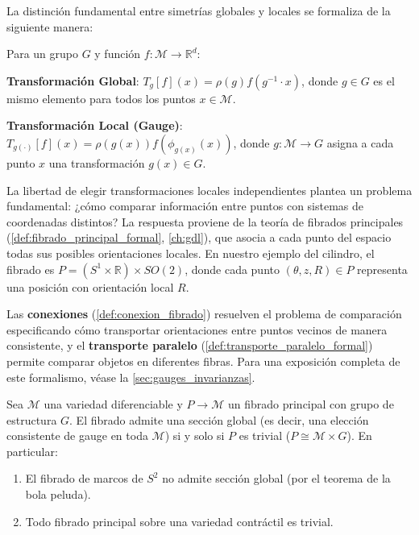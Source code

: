 La distinción fundamental entre simetrías globales y locales se formaliza de la siguiente manera:

\begin{definition}
Para un grupo $G$ y función $f: \mathcal{M} \to \mathbb{R}^d$:

\textbf{Transformación Global}: $T_g[f](x) = \rho(g) f(g^{-1} \cdot x)$, donde $g \in G$ es el mismo elemento para todos los puntos $x \in \mathcal{M}$.

\textbf{Transformación Local (Gauge)}: $T_{g(\cdot)}[f](x) = \rho(g(x)) f(\phi_{g(x)}(x))$, donde $g: \mathcal{M} \to G$ asigna a cada punto $x$ una transformación $g(x) \in G$.
\end{definition}

La libertad de elegir transformaciones locales independientes plantea un problema fundamental: ¿cómo comparar información entre puntos con sistemas de coordenadas distintos? La respuesta proviene de la teoría de fibrados principales (\autoref{def:fibrado_principal_formal}, \autoref{ch:gdl}), que asocia a cada punto del espacio todas sus posibles orientaciones locales. En nuestro ejemplo del cilindro, el fibrado es $P = (S^1 \times \mathbb{R}) \times SO(2)$, donde cada punto $(\theta, z, R) \in P$ representa una posición con orientación local $R$.

Las \textbf{conexiones} (\autoref{def:conexion_fibrado}) resuelven el problema de comparación especificando cómo transportar orientaciones entre puntos vecinos de manera consistente, y el \textbf{transporte paralelo} (\autoref{def:transporte_paralelo_formal}) permite comparar objetos en diferentes fibras. Para una exposición completa de este formalismo, véase la \autoref{sec:gauges_invarianzas}.

\begin{proposition}\label{prop:obstruccion_gauge_global}
Sea $\mathcal{M}$ una variedad diferenciable y $P \to \mathcal{M}$ un fibrado principal con grupo de estructura $G$. El fibrado admite una sección global (es decir, una elección consistente de gauge en toda $\mathcal{M}$) si y solo si $P$ es trivial ($P \cong \mathcal{M} \times G$). En particular:
\begin{enumerate}
    \item El fibrado de marcos de $S^2$ no admite sección global (por el teorema de la bola peluda).
    \item Todo fibrado principal sobre una variedad contráctil es trivial.
\end{enumerate}
\end{proposition}


